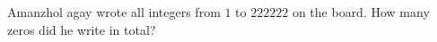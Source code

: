 Amanzhol agay wrote all integers from $1$ to $222222$ on the board. How many zeros did he write in total?
